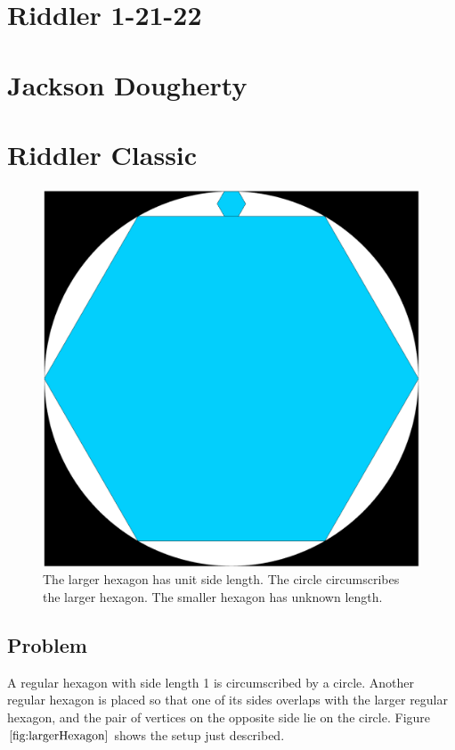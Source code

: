 \documentclass[reqno]{amsart}
\begin{document}
\section*{Riddler 1-21-22}
\section*{Jackson Dougherty}

\section{Riddler Classic}

\begin{figure}[h]
	\centering
	\includegraphics[scale = 0.75]{EmbedHexagon.png}
	\caption{The larger hexagon has unit side length. The circle circumscribes the larger hexagon. The smaller hexagon has unknown length.}
	\label{fig:largerHexagon}
\end{figure}

\subsection*{Problem}

A regular hexagon with side length 1 is circumscribed by a circle. Another regular hexagon is placed so that one of its sides overlaps with the larger regular hexagon, and the pair of vertices on the opposite side lie on the circle. Figure $\ref{fig:largerHexagon}$ shows the setup just described. 
\end{document}
